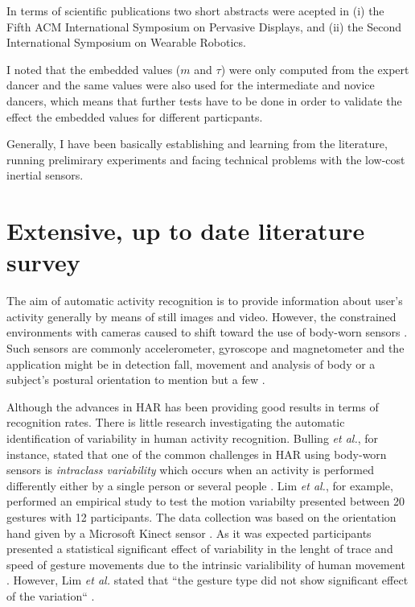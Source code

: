 \documentclass[10pt,journal,onecolumn,compsoc]{IEEEtran}
\begin{document}
In terms of scientific publications two short abstracts were acepted in
(i) the Fifth ACM International Symposium on Pervasive Displays, and 
(ii) the Second International Symposium on Wearable Robotics.

I noted that the embedded values ($m$ and $\tau$)  were 
only computed from the expert dancer and 
the same values were also used for the intermediate and novice dancers,
which means that further tests have to be done in order to validate the 
effect the embedded values for different particpants.

Generally, I have been basically establishing and learning 
from the literature, running prelimirary experiments 
and facing technical problems with the low-cost inertial sensors. 


\appendices

\section{Extensive, up to date literature survey}


The aim of automatic activity recognition is to provide information about user's activity
generally by means of still images and video. However, the constrained environments
with cameras caused to shift toward the use of body-worn sensors \cite{bulling2014}.
Such sensors are commonly accelerometer, gyroscope and magnetometer and 
the application might be in detection fall, movement and analysis of body 
or a subject's postural orientation to mention but a few \cite{Mukhopadhyay2014}.

Although the advances in HAR has been providing good results in terms of recognition rates.
There is little research investigating the automatic identification of variability in human activity recognition.
Bulling \textit{et al.}, for instance, stated that one of the common challenges in HAR 
using body-worn sensors is \textit{intraclass variability} which occurs when 
an activity is performed differently either by a single person or several people \cite{bulling2014} . 
Lim \textit{et al.}, for example, performed an empirical study to test the motion variabilty 
presented between 20 gestures with 12 participants. %
The data collection was based on the orientation hand given by a Microsoft Kinect sensor \cite{Lim2012}. %
As it was expected participants presented a statistical significant effect of variability in the lenght of trace 
and speed of gesture movements due to the intrinsic varialibility of human movement  \cite{newell1993variability}.
However, Lim \textit{et al.} stated that ``the gesture type did not show significant effect of the variation`` \cite{Lim2012}.
\end{document}
